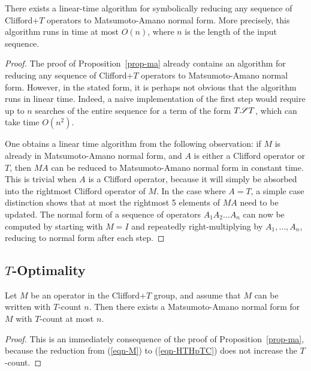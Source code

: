 \begin{corollary}\label{cor-efficient}
  There exists a linear-time algorithm for symbolically reducing any sequence of Clifford+$T$
  operators to Matsumoto-Amano normal form. More precisely, this algorithm runs in time at most
  $O(n)$, where $n$ is the length of the input sequence.
\end{corollary}

\begin{proof}
  The proof of Proposition~\ref{prop-ma} already contains an algorithm for reducing any sequence of
  Clifford+$T$ operators to Matsumoto-Amano normal form. However, in the stated form, it is perhaps
  not obvious that the algorithm runs in linear time. Indeed, a naive implementation of the first
  step would require up to $n$ searches of the entire sequence for a term of the form $T\mathscr{S} T$,
  which can take time $O(n^2)$.

  One obtains a linear time algorithm from the following observation: if $M$ is already in
  Matsumoto-Amano normal form, and $A$ is either a Clifford operator or $T$, then $MA$ can be
  reduced to Matsumoto-Amano normal form in constant time. This is trivial when $A$ is a Clifford
  operator, because it will simply be absorbed into the rightmost Clifford operator of $M$. In the
  case where $A=T$, a simple case distinction shows that at most the rightmost 5 elements of $MA$
  need to be updated. The normal form of a sequence of operators $A_1A_2\ldots A_n$ can now be
  computed by starting with $M=I$ and repeatedly right-multiplying by $A_1,\ldots,A_n$, reducing to
  normal form after each step.
\end{proof}


\subsection{$T$-Optimality} %
\label{sub:_t_optimality}
\begin{corollary}
  Let $M$ be an operator in the Clifford+$T$ group, and assume that $M$ can be written with
  $T$-count $n$. Then there exists a Matsumoto-Amano normal form for $M$ with $T$-count at most $n$.
\end{corollary}

\begin{proof}
  This is an immediately consequence of the proof of Proposition~\ref{prop-ma}, because the
  reduction from (\ref{eqn-M}) to (\ref{eqn-HTHpTC}) does not increase the $T$-count.
\end{proof}

